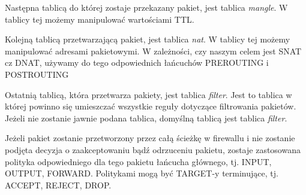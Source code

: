 			Następna tablicą do której zostaje przekazany pakiet, jest tablica \textit{mangle}.
			W tablicy tej możemy manipulować wartościami TTL.

			Kolejną tablicą przetwarzającą pakiet, jest tablica \textit{nat}.
			W tablicy tej możemy manipulować adresami pakietowymi.
			W zależności, czy naszym celem jest SNAT cz DNAT, używamy do tego odpowiednich łańcuchów PREROUTING i POSTROUTING

			Ostatnią tablicą, która przetwarza pakiety, jest tablica \textit{filter}. Jest to tablica w której powinno się umieszczać wszystkie reguły dotyczące filtrowania pakietów. 
			Jeżeli nie zostanie jawnie podana tablica, domyślną tablicą jest tablica \textit{filter}.

			Jeżeli pakiet zostanie przetworzony przez całą ścieżkę w firewallu i nie zostanie podjęta decyzja o zaakceptowaniu bądź odrzuceniu pakietu, zostaje zastosowana polityka odpowiedniego dla tego pakietu łańcucha głównego, tj. INPUT, OUTPUT, FORWARD.
			Politykami mogą być TARGET-y terminujące, tj. ACCEPT, REJECT, DROP.
